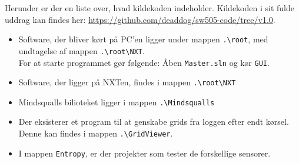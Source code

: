 Herunder er der en liste over, hvad kildekoden indeholder.
Kildekoden i sit fulde uddrag kan findes her: \url{https://github.com/deaddog/sw505-code/tree/v1.0}.

\begin{itemize}
\item Software, der bliver kørt på PC'en ligger under mappen \lstinline[style=c]!.\root!, med undtagelse af mappen \lstinline[style=c]!.\root\NXT!.
\\
For at starte programmet gør følgende:
Åben \lstinline[style=c]!Master.sln! og kør \lstinline[style=c]!GUI!.
\item Software, der ligger på NXTen, findes i mappen \lstinline[style=c]!.\root\NXT!
\item Mindsqualls bilioteket ligger i mappen \lstinline[style=c]!.\Mindsqualls!
\item Der eksisterer et program til at genskabe grids fra loggen efter endt kørsel.
Denne kan findes i mappen \lstinline[style=c]!.\GridViewer!.
\item I mappen \lstinline[style=c]!Entropy!, er der projekter som tester de forskellige sensorer.
\end{itemize}